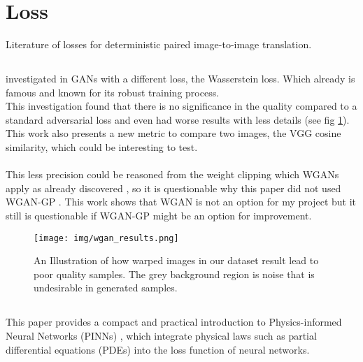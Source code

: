 	
	\newpage
	\section{Loss}
	\label{sec:lit-loss}
		Literature of losses for deterministic paired image-to-image translation.
		
		\subsection{}
			\citeauthor{noah_makow_wasserstein_2018} investigated in GANs with a different loss, the Wasserstein loss. Which already is famous and known for its robust training process.\\
			This investigation found that there is no significance in the quality compared to a standard adversarial loss and even had worse results with less details (see fig \ref{fig:wgan_vs_gan}).\\
			This work also presents a new metric to compare two images, the VGG cosine similarity, which could be interesting to test.\\
			\\
			This less precision could be reasoned from the weight clipping which WGANs apply as already discovered \cite{gulrajani_improved_2017}, so it is questionable why this paper did not used WGAN-GP \cite{gulrajani_improved_2017}. This work shows that WGAN is not an option for my project but it still is questionable if WGAN-GP might be an option for improvement.
			\begin{figure}[H]
				\centering
				\texttt{[image: img/wgan\_results.png]}
				\caption[Results of using WGAN]{An Illustration of how warped images in our dataset result lead to poor quality samples. The grey background region is noise that is undesirable in generated samples.}
				\label{fig:wgan_vs_gan}
			\end{figure}
			\FloatBarrier
			
		\newpage
			
		\subsection{}
			This paper provides a compact and practical introduction to Physics-informed Neural Networks (PINNs) \cite{raissi_physics_2017}, which integrate physical laws such as partial differential equations (PDEs) into the loss function of neural networks.
			
